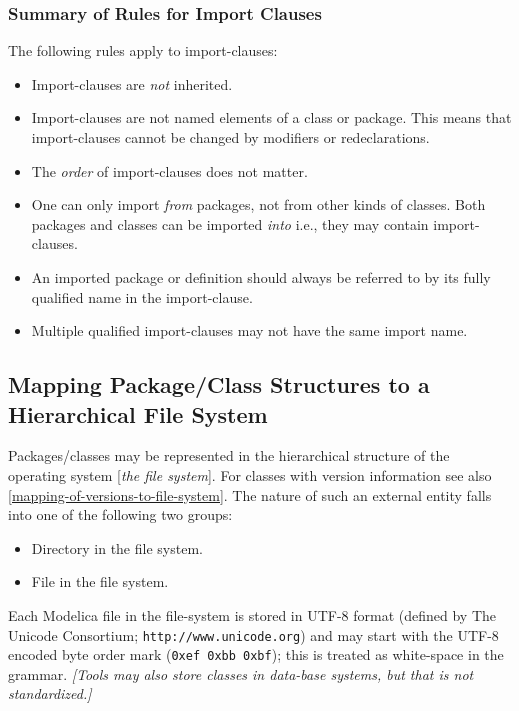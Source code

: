 \subsubsection{Summary of Rules for Import Clauses}

The following rules apply to import-clauses:

\begin{itemize}
\item
  Import-clauses are \emph{not} inherited.
\item
  Import-clauses are not named elements of a class or package. This
  means that import-clauses cannot be changed by modifiers or
  redeclarations.
\item
  The \emph{order} of import-clauses does not matter.
\item
  One can only import \emph{from} packages, not from other kinds of
  classes. Both packages and classes can be imported \emph{into} i.e.,
  they may contain import-clauses.
\item
  An imported package or definition should always be referred to by its
  fully qualified name in the import-clause.
\item
  Multiple qualified import-clauses may not have the same import name.
\end{itemize}

\subsection{Mapping Package/Class Structures to a Hierarchical File System}

Packages/classes may be represented in the hierarchical structure of the
operating system {[}\emph{the file system}{]}. For classes with version
information see also \autoref{mapping-of-versions-to-file-system}. The nature of such an external
entity falls into one of the following two groups:

\begin{itemize}
\item
  Directory in the file system.
\end{itemize}

\begin{itemize}
\item
  File in the file system.
\end{itemize}

Each Modelica file in the file-system is stored in UTF-8 format (defined
by The Unicode Consortium; \lstinline[basicstyle=\ttfamily]!http://www.unicode.org!) and may start with
the UTF-8 encoded byte order mark (\lstinline[basicstyle=\ttfamily]!0xef 0xbb 0xbf!); this is treated as
white-space in the grammar. \emph{{[}Tools may also store classes in
data-base systems, but that is not standardized.{]}}

